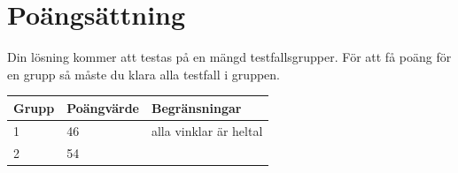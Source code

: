 \section*{Poängsättning}
Din lösning kommer att testas på en mängd testfallsgrupper. För att få poäng för en grupp så måste du klara alla testfall i gruppen.

\begin{tabular}{| l | l | l |}
	\hline
	Grupp & Poängvärde & Begränsningar\\ \hline
  1     & 46         & alla vinklar är heltal \\ \hline
  2     & 54         & \\ \hline
\end{tabular}
